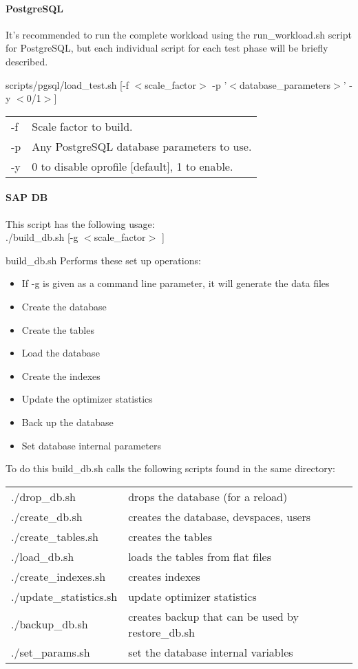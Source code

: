 \documentclass{article}
\begin{document}
\paragraph{PostgreSQL}
\noindent
It's recommended to run the complete workload using the
run\_workload.sh script for PostgreSQL, but each individual script
for each test phase will be briefly described.

\noindent
scripts/pgsql/load\_test.sh [-f $<$scale\_factor$>$ -p '$<$database\_parameters$>$' -y $<$0/1$>$]
\begin{tabular}[c]{ll} 
-f      & Scale factor to build. \\
-p      & Any PostgreSQL database parameters to use. \\
-y      & 0 to disable oprofile [default], 1 to enable. \\
\end{tabular}

\noindent

\paragraph{SAP DB}
This script has the following usage: \\
\indent ./build\_db.sh [-g $<$scale\_factor$>$ ]

\noindent
build\_db.sh  Performs these set up operations: \\
\begin{itemize}
\item If -g is given as a command line parameter, it will generate the data files
\item Create the database
\item Create the tables
\item Load the database
\item Create the indexes
\item Update the optimizer statistics
\item Back up the database
\item Set database internal parameters
\end{itemize}

\noindent
To do this build\_db.sh calls the following scripts found in the same
directory: \\
\begin{tabular}[c]{ll}
./drop\_db.sh		& drops the database (for a reload) \\
./create\_db.sh		& creates the database, devspaces, users \\
./create\_tables.sh	& creates the tables \\
./load\_db.sh		& loads the tables from flat files \\
./create\_indexes.sh	& creates indexes \\
./update\_statistics.sh	& update optimizer statistics \\
./backup\_db.sh		& creates backup that can be used by restore\_db.sh \\
./set\_params.sh	& set the database internal variables \\
\end{tabular}
\end{document}
